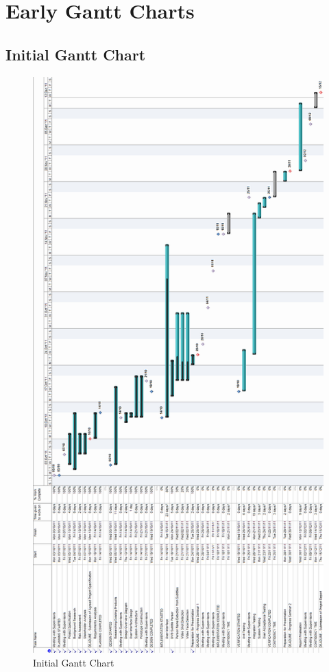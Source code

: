 \newpage
\section{Early Gantt Charts}
\label{sec:GanttChart}

\subsection{Initial Gantt Chart}
\begin{figure}[h1]
\begin{center}
\includegraphics[trim = 0mm 0mm 0mm 0mm, clip, scale=0.25]{Images/intial_gantt_chart.png}
\end{center}
\caption{Initial Gantt Chart}
\end{figure}

